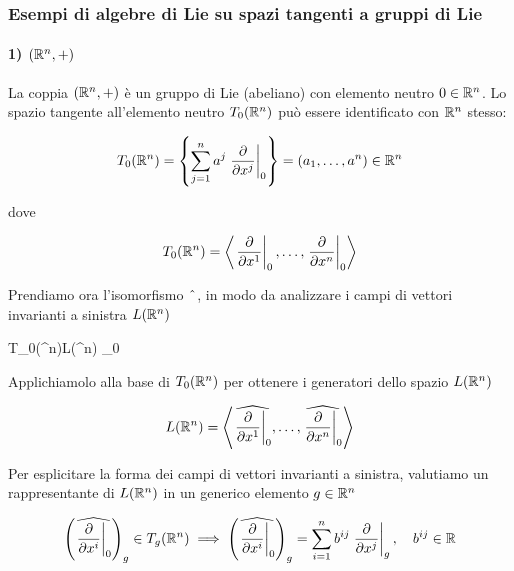 \subsubsection{Esempi di algebre di Lie su spazi tangenti a gruppi di Lie}

\paragraph{1) $ (\mathbb{R}^{n},+) $}

La coppia $ (\mathbb{R}^{n},+) $ è un gruppo di Lie (abeliano) con elemento neutro $ 0 \in \mathbb{R}^{n} $. Lo spazio tangente all'elemento neutro $ T_{0}(\mathbb{R}^{n}) $ può essere identificato con $ \mathbb{R}^{n} $ stesso:

\begin{equation}
	T_{0}(\R^{n}) = \left\{ \sum_{j=1}^{n} a^{j} \eval{\pdv{x^{j}}}_{0} \right\} = (a_{1},\dots,a^{n}) \in \R^{n}
\end{equation}

dove

\begin{equation}
	T_{0}(\R^{n}) = \ev{ \eval{ \pdv{x^{1}} }_{0}, \dots, \eval{ \pdv{x^{n}} }_{0} }
\end{equation}

Prendiamo ora l'isomorfismo $ \; \hat{} \; $, in modo da analizzare i campi di vettori invarianti a sinistra $ L(\mathbb{R}^{n}) $

\map{\hatapp}%
	{T_{0}(\R^{n})}{L(\R^{n})}%
	{_{0}}{}

Applichiamolo alla base di $ T_{0}(\mathbb{R}^{n}) $ per ottenere i generatori dello spazio $ L(\mathbb{R}^{n}) $

\begin{equation}
	L(\R^{n}) = \ev{ \widehat{ \eval{ \pdv{x^{1}} }_{0} }, \dots, \widehat{ \eval{ \pdv{x^{n}} }_{0} } }
\end{equation}

Per esplicitare la forma dei campi di vettori invarianti a sinistra, valutiamo un rappresentante di $ L(\mathbb{R}^{n}) $ in un generico elemento $ g \in \mathbb{R}^{n} $

\begin{align}
	\begin{split}
		\left( \widehat{ \eval{ \pdv{x^{i}} }_{0} } \right)_{g} \in T_{g}(\R^{n}) %
		\implies%
		\left( \widehat{ \eval{ \pdv{x^{i}} }_{0} } \right)_{g} = \sum_{i=1}^{n} b^{ij} \eval{ \pdv{x^{j}} }_{g} \qcomma b^{ij} \in \R
	\end{split}
\end{align}

